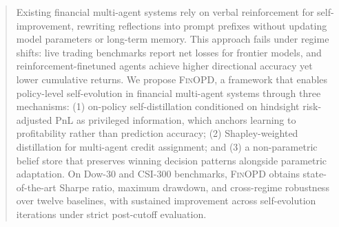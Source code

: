 \begin{abstract}
Existing financial multi-agent systems rely on verbal reinforcement for self-improvement, rewriting reflections into prompt prefixes without updating model parameters or long-term memory. This approach fails under regime shifts: live trading benchmarks report net losses for frontier models, and reinforcement-finetuned agents achieve higher directional accuracy yet lower cumulative returns. We propose \textsc{FinOPD}, a framework that enables policy-level self-evolution in financial multi-agent systems through three mechanisms: (1) on-policy self-distillation conditioned on hindsight risk-adjusted PnL as privileged information, which anchors learning to profitability rather than prediction accuracy; (2) Shapley-weighted distillation for multi-agent credit assignment; and (3) a non-parametric belief store that preserves winning decision patterns alongside parametric adaptation. On Dow-30 and CSI-300 benchmarks, \textsc{FinOPD} obtains state-of-the-art Sharpe ratio, maximum drawdown, and cross-regime robustness over twelve baselines, with sustained improvement across self-evolution iterations under strict post-cutoff evaluation.
\end{abstract}
